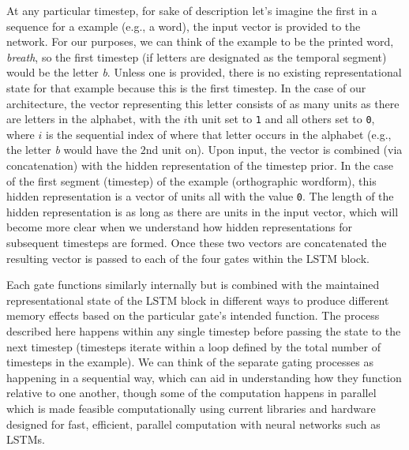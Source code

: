 \documentclass[
  american,
  man,floatsintext]{apa6}
\begin{document}
At any particular timestep, for sake of description let's imagine the first in a sequence for a example (e.g., a word), the input vector is provided to the network. For our purposes, we can think of the example to be the printed word, \emph{breath}, so the first timestep (if letters are designated as the temporal segment) would be the letter \emph{b}. Unless one is provided, there is no existing representational state for that example because this is the first timestep. In the case of our architecture, the vector representing this letter consists of as many units as there are letters in the alphabet, with the \(i\)th unit set to \texttt{1} and all others set to \texttt{0}, where \(i\) is the sequential index of where that letter occurs in the alphabet (e.g., the letter \emph{b} would have the \(2\)nd unit on). Upon input, the vector is combined (via concatenation) with the hidden representation of the timestep prior. In the case of the first segment (timestep) of the example (orthographic wordform), this hidden representation is a vector of units all with the value \texttt{0}. The length of the hidden representation is as long as there are units in the input vector, which will become more clear when we understand how hidden representations for subsequent timesteps are formed. Once these two vectors are concatenated the resulting vector is passed to each of the four gates within the LSTM block.

Each gate functions similarly internally but is combined with the maintained representational state of the LSTM block in different ways to produce different memory effects based on the particular gate's intended function. The process described here happens within any single timestep before passing the state to the next timestep (timesteps iterate within a loop defined by the total number of timesteps in the example). We can think of the separate gating processes as happening in a sequential way, which can aid in understanding how they function relative to one another, though some of the computation happens in parallel which is made feasible computationally using current libraries and hardware designed for fast, efficient, parallel computation with neural networks such as LSTMs.
\end{document}
